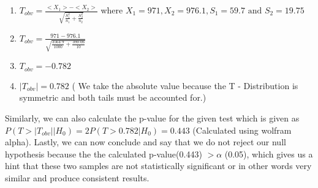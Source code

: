 \begin{enumerate}
    \item $T_{obv} = \frac{<X_1> - <X_2>}{\sqrt{\frac{S_1^2}{n_1} + \frac{S_2^2}{n_2}}}$ where $X_1 = 971, X_2 = 976.1, S_1 = 59.7 \text{ and } S_2 = 19.75$ 
    \item $T_{obv} = \frac{971 - 976.1}{\sqrt{\frac{3564.9}{1000} + \frac{390.06}{10}}}$
    \item $T_{obv} = - 0.782$
    \item $|T_{obv}| = 0.782$ ( We take the absolute value because the T - Distribution is symmetric and both tails must be accounted for.)
\end{enumerate}
Similarly, we can also calculate the p-value for the given test which is given as $P(T > |T_{obv}| | H_0) = 2P(T > 0.782 | H_0) = 0.443 $ (Calculated using wolfram alpha). Lastly, we can now conclude and say that we do not reject our null hypothesis because the the calculated p-value(0.443)  $> \alpha$ (0.05), which gives us a hint that these two samples are not statistically significant or in other words very similar and produce consistent results.